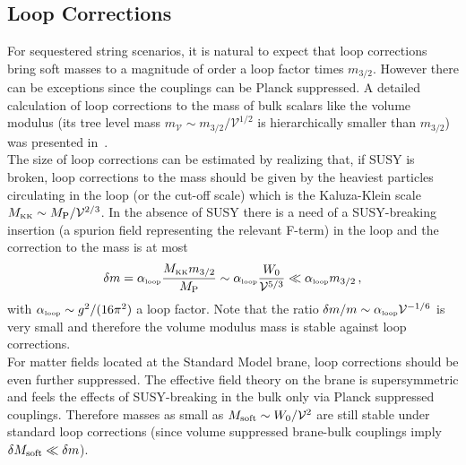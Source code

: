 \documentclass[12pt,a4paper]{book}
\def\KK{{\scriptscriptstyle \rm KK}}
\def\lp{{\scriptscriptstyle \rm loop}}
\begin{document}
\subsection{Loop Corrections}

For sequestered string scenarios, it is natural to expect that loop corrections bring soft masses to a magnitude of order a loop factor times $m_{3/2}$. However there can be exceptions since the couplings can be Planck suppressed. A detailed calculation of loop corrections to the mass of bulk scalars like the volume modulus (its tree level mass $m_\mathcal{V} \sim m_{3/2}/\mathcal{V}^{1/2}$ is hierarchically smaller than $m_{3/2}$) was presented in~\cite{Burgess:2010sy}.\\

The size of loop corrections can be estimated by realizing that, if SUSY is broken, loop corrections to the mass should be given by the heaviest particles circulating in the loop (or the cut-off scale) which is the Kaluza-Klein scale $M_\KK\sim M_{\rm P}/\mathcal{V}^{2/3}$. In the absence of SUSY there is a need of a SUSY-breaking insertion (a spurion field representing the relevant F-term) in the loop and the correction to the mass is at most
\begin{align}
\delta m=\alpha_\lp \frac{M_\KK m_{3/2}}{M_{\rm P}}\sim \alpha_\lp\frac{W_0}{\mathcal{V}^{5/3}}\ll \alpha_\lp m_{3/2}\,,
\end{align}
with $\alpha_\lp\sim g^2/(16\pi^2)$ a loop factor. Note that the ratio $\delta m/m\sim \alpha_\lp \mathcal{V}^{-1/6}$ is very small and therefore the volume modulus mass is stable against loop corrections.\\

For matter fields located at the Standard Model brane, loop corrections should be even further suppressed.
The effective field theory on the brane is supersymmetric and feels the effects of SUSY-breaking in the bulk only via Planck suppressed couplings. Therefore masses as small as $M_{\rm soft}\sim W_0/\mathcal{V}^2$ are still stable under standard loop corrections (since volume suppressed brane-bulk couplings imply $\delta M_{\rm soft}\ll \delta m$).\\
\end{document}
